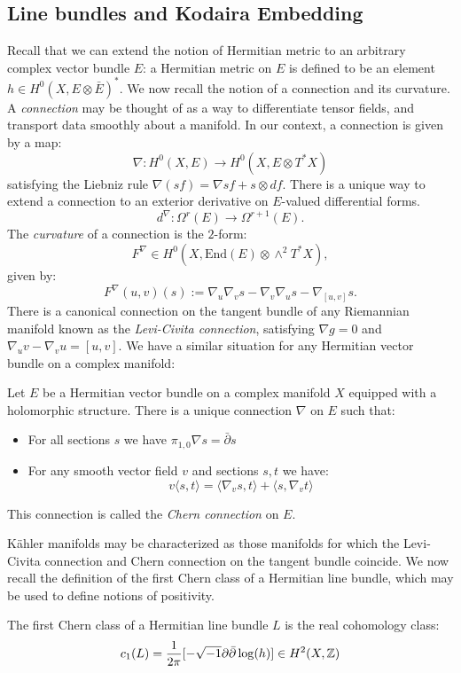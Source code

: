 \subsection{Line bundles and Kodaira Embedding}
Recall that we can extend the notion of Hermitian metric to an arbitrary complex vector bundle \(E\): a Hermitian metric on \(E\) is defined to be an element \(h \in H^0(X, E \otimes \bar{E})^* \). We now recall the notion of a connection and its curvature. A \textit{connection} may be thought of as a way to differentiate tensor fields, and transport data smoothly about a manifold. In our context,  a connection is given by a map:
\[
\nabla: H^0(X,E) \to H^0(X,E \otimes T^* X)
\]
satisfying the Liebniz rule \(\nabla(s f) = \nabla s f + s \otimes df\). There is a unique way to extend a connection to an exterior derivative on \(E\)-valued differential forms.
\[
d^\nabla: \Omega^r(E) \to \Omega^{r+1}(E).
\]
The \textit{curvature} of a connection is the \(2\)-form:
\[
F^\nabla \in H^0(X, \text{End}(E) \otimes \wedge^2 T^* X),
\]
given by:
\[
F^\nabla(u,v)(s) := \nabla_u \nabla_v s - \nabla_v \nabla_u s - \nabla_{[u,v]} s.
\]
There is a canonical connection on the tangent bundle of any Riemannian manifold known as the \textit{Levi-Civita connection}, satisfying \(\nabla g = 0\) and \(\nabla_u v - \nabla_v u = [u,v]\). We have a similar situation for any Hermitian vector bundle on a complex manifold:	
\begin{example}
Let \(E\) be a Hermitian vector bundle on a complex manifold \(X\) equipped with a holomorphic structure. There is a unique connection \(\nabla\) on \(E\) such that:
\begin{itemize}
\item For all sections \(s\) we have \(\pi_{1,0} \nabla s = \bar{\partial} s\)
\item For any smooth vector field \(v\) and sections \(s,t\) we have:
\[
v \langle s,t \rangle = \langle \nabla_v s , t \rangle + \langle s, \nabla_v t \rangle
\] 
\end{itemize}
This connection is called the \textit{Chern connection} on \(E\).
\end{example}
K\"ahler manifolds may be characterized as those manifolds for which the Levi-Civita connection and Chern connection on the tangent bundle coincide. We now recall the definition of the first Chern class of a Hermitian line bundle, which may be used to define notions of positivity.
\begin{definition}
The first Chern class of a Hermitian line bundle \(L\) is the real cohomology class:
\[
c_1(L) = \frac{1}{2 \pi} [  - \sqrt{-1} \partial \bar{\partial} \log(h) ] \in H^2(X, \mathbb{Z})
\]
\end{definition}
